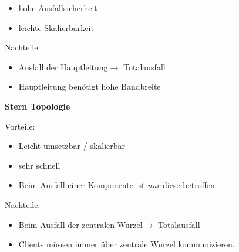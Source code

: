 \documentclass[12pt,a4paper]{article}
\begin{document}
\begin{minipage}[t]{.48\textwidth}
\begin{flushleft}
					\begin{itemize}
						\footnotesize
						\item hohe Ausfallsicherheit
						\item leichte Skalierbarkeit
					\end{itemize}
				\footnotesize Nachteile:
					\begin{itemize}
						\footnotesize
						\item Ausfall der Hauptleitung\newline $\longrightarrow$ Totalausfall
						\item Hauptleitung benötigt hohe Bandbreite
					\end{itemize}
				\end{flushleft}
			\end{minipage}
			\begin{minipage}[t]{.48\textwidth}
				\textbf{Stern Topologie}
				\begin{flushright}
				\end{flushright}
				\footnotesize Vorteile:
				\begin{itemize}
					\footnotesize
					\item Leicht umsetzbar / skalierbar
					\item sehr schnell
					\item Beim Ausfall einer Komponente ist \textit{nur} diese betroffen
				\end{itemize}
				\footnotesize Nachteile:
				\begin{itemize}
					\footnotesize
					\item Beim Ausfall der zentralen Wurzel\newline $\longrightarrow$ Totalausfall
					\item Clients müssen immer über zentrale Wurzel kommunizieren.
				\end{itemize}
				\vspace{0.3cm}

\end{minipage}
\end{document}

